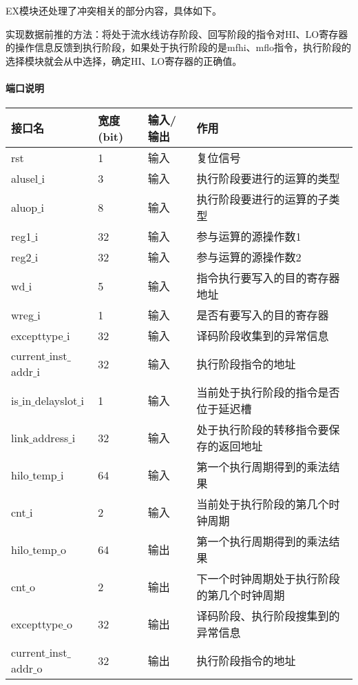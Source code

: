 EX模块还处理了冲突相关的部分内容，具体如下。

实现数据前推的方法：将处于流水线访存阶段、回写阶段的指令对HI、LO寄存器的操作信息反馈到执行阶段，如果处于执行阶段的是mfhi、mflo指令，执行阶段的选择模块就会从中选择，确定HI、LO寄存器的正确值。
\paragraph{端口说明}
\quad

\quad
	\begin{longtable}{|l|l|l|l|}
		\hline
		接口名 & 宽度(bit) & 输入/输出 & 作用 \\
		\hline
		rst & 1 & 输入 & 复位信号 \\
		\hline
		alusel$\_$i & 3 & 输入 & 执行阶段要进行的运算的类型 \\
		\hline
		aluop$\_$i & 8 & 输入 & 执行阶段要进行的运算的子类型 \\
		\hline
		reg1$\_$i & 32 & 输入 & 参与运算的源操作数1 \\
		\hline
		reg2$\_$i & 32 & 输入 & 参与运算的源操作数2 \\
		\hline
		wd$\_$i & 5 & 输入 & 指令执行要写入的目的寄存器地址 \\
		\hline
		wreg$\_$i & 1 & 输入 & 是否有要写入的目的寄存器 \\
		\hline
		excepttype$\_$i & 32 & 输入 & 译码阶段收集到的异常信息 \\
		\hline
		current$\_$inst$\_$addr$\_$i & 32 & 输入 & 执行阶段指令的地址 \\
		\hline
		is$\_$in$\_$delayslot$\_$i & 1 & 输入 & 当前处于执行阶段的指令是否位于延迟槽 \\
		\hline
		link$\_$address$\_$i & 32 & 输入 & 处于执行阶段的转移指令要保存的返回地址 \\
		\hline
		hilo$\_$temp$\_$i & 64 & 输入 & 第一个执行周期得到的乘法结果 \\
		\hline
		cnt$\_$i & 2 & 输入 & 当前处于执行阶段的第几个时钟周期 \\
		\hline
		hilo$\_$temp$\_$o & 64 & 输出 & 第一个执行周期得到的乘法结果 \\
		\hline
		cnt$\_$o & 2 & 输出 & 下一个时钟周期处于执行阶段的第几个时钟周期 \\
		\hline
		excepttype$\_$o & 32 & 输出 & 译码阶段、执行阶段搜集到的异常信息 \\
		\hline
		current$\_$inst$\_$addr$\_$o & 32 & 输出 & 执行阶段指令的地址 \\

\end{longtable}
